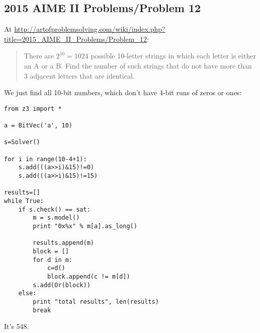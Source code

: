 \subsection{2015 AIME II Problems/Problem 12}

At \url{http://artofproblemsolving.com/wiki/index.php?title=2015_AIME_II_Problems/Problem_12}:

\begin{framed}
\begin{quotation}
There are $2^{10} = 1024$ possible 10-letter strings in which each letter is either an A or a B.
Find the number of such strings that do not have more than 3 adjacent letters that are identical. 
\end{quotation}
\end{framed}

We just find all 10-bit numbers, which don't have 4-bit runs of zeros or ones:

\begin{lstlisting}
from z3 import *

a = BitVec('a', 10)

s=Solver()

for i in range(10-4+1):
    s.add(((a>>i)&15)!=0)
    s.add(((a>>i)&15)!=15)

results=[]
while True:
    if s.check() == sat:
        m = s.model()
        print "0x%x" % m[a].as_long()

        results.append(m)
        block = []
        for d in m:
            c=d()
            block.append(c != m[d])
        s.add(Or(block))
    else:
        print "total results", len(results)
        break
\end{lstlisting}

It's 548.

